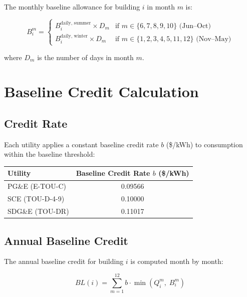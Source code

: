 \documentclass[11pt]{article}
\begin{document}
The monthly baseline allowance for building $i$ in month $m$ is:

\begin{equation}
    B_i^m = \begin{cases}
        B_i^{\text{daily, summer}} \times D_m & \text{if } m \in \{6, 7, 8, 9, 10\} \text{ (Jun--Oct)} \\
        B_i^{\text{daily, winter}} \times D_m & \text{if } m \in \{1, 2, 3, 4, 5, 11, 12\} \text{ (Nov--May)}
    \end{cases}
\end{equation}

where $D_m$ is the number of days in month $m$.

\section{Baseline Credit Calculation}

\subsection{Credit Rate}

Each utility applies a constant baseline credit rate $b$ (\$/kWh) to consumption within the baseline threshold:

\begin{table}[htbp]
\centering
\begin{tabular}{l c}
\toprule
\textbf{Utility} & \textbf{Baseline Credit Rate} $b$ \textbf{(\$/kWh)} \\
\midrule
PG\&E (E-TOU-C) & 0.09566 \\
SCE (TOU-D-4-9) & 0.10000 \\
SDG\&E (TOU-DR) & 0.11017 \\
\bottomrule
\end{tabular}
\end{table}

\subsection{Annual Baseline Credit}

The annual baseline credit for building $i$ is computed month by month:

\begin{equation}
    BL(i) = \sum_{m=1}^{12} b \cdot \min\!\left(Q_i^m,\; B_i^m\right)
\end{equation}
\end{document}
